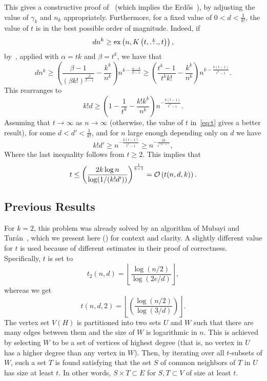 This gives a constructive proof of~ (which implies the Erdős~),
by adjusting the value of $\gamma_k$ and $n_k$ appropriately.
Furthermore, for a fixed value of $0 < d < \frac{1}{k!}$,
the value of $t$ is in the best possible order of magnitude.
Indeed, if
\[
    dn^k \geq \text{ex} \left( n, K\left(t, \overset{k}{\dots}, t\right) \right),
\]
by~,
applied with $\alpha = tk$ and $\beta = t^k$,
we have that
\[
    dn^k \geq \left( \frac{\beta - 1}{(\beta k!)^{\frac{\beta}{\beta - 1}}}  - \frac{k^k}{n^k} \right) n^{k - \frac{\alpha - k}{\beta - 1}}
    \geq \left( \frac{t^k - 1}{t^k k!}  - \frac{k^k}{n^k} \right) n^{k - \frac{k(t-1)}{t^k - 1}}.
\]
This rearranges to
\[
    k! d \geq \left( 1 - \frac{1}{t^k} - \frac{k! k^k}{n^k} \right) n^{-\frac{k(t-1)}{t^k - 1}}.
\]
Assuming that $t \to \infty$ as $n \to \infty$ (otherwise, the value of $t$ in~\eqref{eq:t} gives a better result),
for some $d < d' < \frac{1}{k!}$, and for $n$ large enough depending only on $d$ we have
\[
    k! d' \geq n^{-\frac{k(t-1)}{t^k - 1}} \geq n^{-\frac{2k}{t^{(k-1)}}},
\]
Where the last inequality follows from $t \geq 2$.
This implies that
\[
    t \leq \left( \frac{2k\log n}{\log (1/(k!d'))} \right)^{\frac{1}{k-1}} = \mathcal{O}\left(t(n, d, k)\right).
\]

\subsection{Previous Results}\label{subsec:previous-results}

For $k = 2$, this problem was already solved by an algorithm of Mubayi and Turán~\cite{MUBAYI2010174},
which we present here () for context and clarity.
A slightly different value for $t$ is used because of different estimates in their proof of correctness.
Specifically, $t$ is set to
\[
    t_2(n, d) = \left\lfloor \frac{\log (n/2) }{\log (2e/d)}\right\rfloor,
\]
whereas we get
\[
    t(n, d, 2) = \left\lfloor
        \left(  \frac{\log (n/2)}{\log (3/d)} \right)
       \right\rfloor.
\]
The vertex set $V(H)$ is partitioned into two sets $U$ and $W$ such that there are many edges between them
and the size of $W$ is logarithmic in $n$.
This is achieved by selecting $W$ to be a set of vertices of highest degree
(that is, no vertex in $U$ has a higher degree than any vertex in $W$).
Then, by iterating over all $t$-subsets of $W$, such a set $T$
is found satisfying that the set $S$ of common neighbors of $T$ in $U$ has size at least $t$.
In other words, $S \times T \subset E$ for $S, T \subset V$ of size at least $t$.

